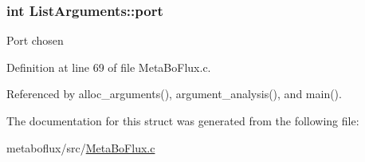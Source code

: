 \hypertarget{structListArguments_ae2ccfbcd131374f1eab65ddc65da7468}{
\subsubsection[{port}]{\setlength{\rightskip}{0pt plus 5cm}int {\bf ListArguments::port}}}
\label{structListArguments_ae2ccfbcd131374f1eab65ddc65da7468}
Port chosen 

Definition at line 69 of file MetaBoFlux.c.



Referenced by alloc\_\-arguments(), argument\_\-analysis(), and main().



The documentation for this struct was generated from the following file:\begin{DoxyCompactItemize}
\item 
metaboflux/src/\hyperlink{MetaBoFlux_8c}{MetaBoFlux.c}\end{DoxyCompactItemize}

